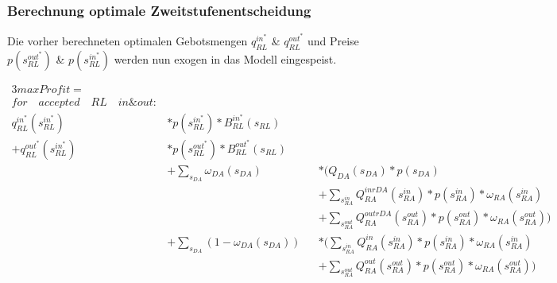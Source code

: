 \documentclass{article}
\begin{document}
\subsubsection{Berechnung optimale Zweitstufenentscheidung}
Die vorher berechneten optimalen Gebotsmengen $q^{in^*}_{RL}$ \& $q^{out^*}_{RL}$ und Preise $p(s^{out^*}_{RL})$ \& $p(s^{in^*}_{RL})$  werden nun exogen in das Modell eingespeist.

\begin{alignat*}{3}  
max Profit  =&\\
for\quad accepted\quad RL\quad in \& out:&\\
q^{in^*}_{RL} (s^{in^*}_{RL})& * p(s^{in^*}_{RL}) * B^{in^*}_{RL} (s_{RL}) \\
+ q^{out^*}_{RL}(s^{in^*}_{RL})& * p(s^{out^*}_{RL}) * B^{out^*}_{RL} (s_{RL})\\
		&+ \sum_{s_{DA}}\omega_{DA}(s_{DA})&& * \Biggl(Q_{DA}(s_{DA}) * p(s_{DA}) \\
		&	    && + \sum_{s^{in}_{RA}} Q^{inrDA}_{RA}(s^{in}_{RA}) * p(s^{in}_{RA}) * \omega_{RA}(s^{in}_{RA})\\
	&		&& + \sum_{s^{out}_{RA}} Q^{outrDA}_{RA}(s^{out}_{RA}) * p(s^{out}_{RA}) * \omega_{RA}(s^{out}_{RA})\Biggr)\\
		& + \sum_{s_{DA}}(1-\omega_{DA}(s_{DA}))&& * \Biggl(\sum_{s^{in}_{RA}} Q^{in}_{RA}(s^{in}_{RA}) * p(s^{in}_{RA}) *             \omega_{RA}(s^{in}_{RA})\\
	&		&& + \sum_{s^{out}_{RA}} Q^{out}_{RA}(s^{out}_{RA}) * p(s^{out}_{RA}) * \omega_{RA}(s^{out}_{RA}) \Biggr) \\
\end{alignat*}
\end{document}
